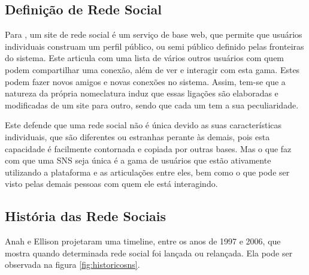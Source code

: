 \subsection{Definição de Rede Social}


\label{sec:definicao}
Para \cite{socialnetworkdefinition}, um site de rede social é um serviço
de base web, que permite que usuários individuais construam um perfil público, ou
semi público definido pelas fronteiras do sistema. Este articula com uma lista de
vários outros usuários com quem podem compartilhar uma conexão, além de ver e
interagir com esta gama. Estes podem fazer novos amigos e novas conexões no sistema.
Assim, tem-se que a natureza da própria nomeclatura induz que essas ligações
são elaboradas e modificadas de um site para outro, sendo que cada um tem a sua
peculiaridade.

Este defende que uma rede social não é única devido as suas características individuais,
que são diferentes ou estranhas perante às demais, pois esta capacidade é facilmente
contornada e copiada por outras bases. Mas o que faz com que uma SNS seja única
é a gama de usuários que estão ativamente utilizando a plataforma e as articulações
entre eles, bem como o que pode ser visto pelas demais pessoas com quem ele está
interagindo.

\subsection{História das Rede Sociais}
\label{sec:historiadasredessociais}
Anah e Ellison projetaram uma timeline, entre os anos de 1997 e 2006, que mostra
quando determinada rede social foi lançada ou relançada. Ela pode ser observada
na figura \ref{fig:historicosns}.

